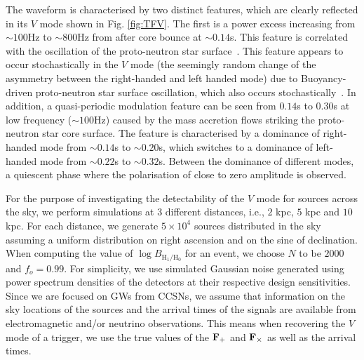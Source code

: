 \documentclass[aps,twocolumn,showpacs,groupedaddress, nofootinbib]{revtex4}  %
\begin{document}
The waveform is characterised by two distinct features, which are clearly reflected in its $V$ mode shown in Fig. \ref{fig:TFV}.
The first is a power excess increasing from $\sim100$Hz to $\sim800$Hz from after core bounce at $\sim 0.14$s. 
This feature is correlated with the oscillation of the proto-neutron star surface~\cite{muller2013new}.
This feature appears to occur stochastically in the $V$ mode (the seemingly random change of the asymmetry between the right-handed and left handed mode) 
due to Buoyancy-driven proto-neutron star surface oscillation, which also occurs stochastically~\cite{murphy2009model}. 
In addition, a quasi-periodic modulation feature can be seen from $0.14$s to $0.30$s at low frequency ($\sim100$Hz) 
caused by the mass accretion flows striking the proto-neutron star core surface.
The feature is characterised by a dominance of right-handed mode from $\sim 0.14$s to $\sim 0.20$s, which switches to a dominance of left-handed mode 
from $\sim 0.22$s to $\sim 0.32$s. 
Between the dominance of different modes, a quiescent phase where the polarisation of close to zero amplitude is observed.

For the purpose of investigating the detectability of the $V$ mode for sources across the sky, 
we perform simulations at $3$ different distances, 
i.e., $2$ kpc, $5$ kpc and $10$ kpc.
For each distance, we generate $5\times 10^4$ sources distributed in the sky assuming a uniform distribution on right ascension and on the sine of declination.
When computing the value of $\log {B_{\text{H}_1 / \text{H}_0}}$ for an event, we choose $N$ to be $2000$ and $f_o = 0.99$. 
For simplicity, we use simulated Gaussian noise generated using
power spectrum densities of the detectors at their respective design sensitivities. 
Since we are focused on \acp{GW} from \acp{CCSN}, 
we assume that information on the sky locations of the sources and the arrival times of the signals are available from
electromagnetic and/or neutrino observations. 
This means when recovering the $V$ mode of a trigger, 
we use the true values of the $\bold{F}_+$ and $\bold{F}_{\times}$ as well as the arrival times.
\end{document}
